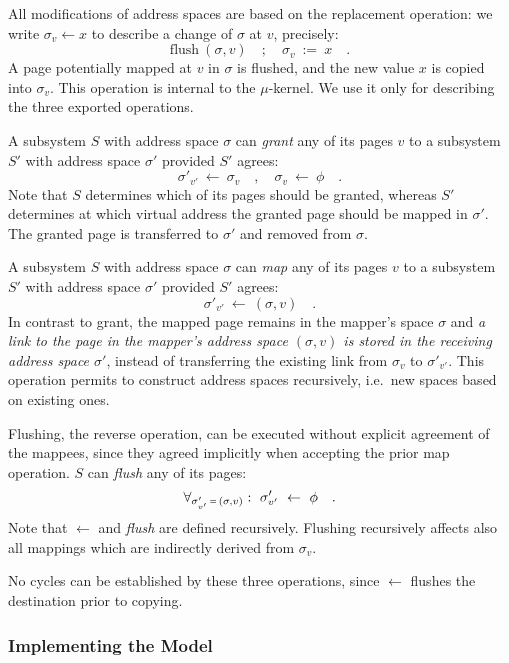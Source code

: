 \documentclass[a4paper,11pt,twoside,dvips]{book}
\newcommand{\micro}{$\mu$}
\newcommand{\smaller}[1]{{\mathchoice 
           {\raisebox{1pt}{$\scriptstyle #1$}} 
           {\raisebox{1pt}{$\scriptstyle #1$}} 
           {\raisebox{0.5pt}{$\scriptscriptstyle #1$}} 
           {\raisebox{0.5pt}{$\scriptscriptstyle #1$}} 
}}
\newcommand{\EQ}{\smaller{=}}
\newcommand{\repl}{\leftarrow}
\begin{document}
All modifications of address spaces are based on the
replacement operation: we write $\sigma_v \repl x$ to describe a change of
$\sigma$ at $v$, precisely: 
% 
\[       \mbox{flush}\ (\sigma,v) \quad ; \quad \sigma_v\ :=\ x  \quad . \] 
% 
A page potentially mapped at $v$ in $\sigma$ is flushed, and the new value
$x$ is copied into $\sigma_v$.
This operation is internal to the \micro-kernel. We use it only for
describing the three exported operations. 



A subsystem $S$ with address space $\sigma$ can {\em grant}
any of its pages $v$ to a subsystem $S'$ with address space
$\sigma'$ provided $S'$ agrees: 
% 
\[ \sigma'_{v'}\ \repl\ \sigma_v \quad,\quad \sigma_v\ \repl\ \phi \quad .\] 
% 
Note that $S$ determines which of its pages should be granted, whereas $S'$
determines at which virtual address the granted page should be mapped in
$\sigma'$. The granted page is transferred to $\sigma'$ and removed from
$\sigma$. 
 
 
A subsystem $S$ with address space $\sigma$ can {\em map}
any of its pages $v$ to a subsystem $S'$ with address space
$\sigma'$ provided $S'$ agrees: 
% 
\[ \sigma'_{v'}\ \repl\ ( \sigma, v) \quad . \] 
% 
In contrast to grant, the mapped page remains in the mapper's space $\sigma$
and {\em a link to the page in the mapper's address space $(\sigma,v)$ is
stored in the receiving address space $\sigma'$}, instead of transferring the
existing link from $\sigma_v$ to $\sigma'_{v'}$. This operation permits to
construct address spaces recursively, i.e.\ new spaces based on existing
ones.
 

Flushing, the reverse operation, can be executed without explicit agreement
of the mappees, since they agreed implicitly when accepting the prior map
operation. $S$ can {\em flush} any of its pages: 
% 
\[ \forall_{\sigma'_{v'}\,\EQ\,(\sigma,v)} :\ \sigma'_{v'}\ \repl\ \phi \quad . \] 
% 
Note that $\repl$ and {\em flush} are defined recursively. Flushing recursively
affects also all mappings which are indirectly derived from $\sigma_v$.
 
 
No cycles can be established by these three
operations, since $\repl$ flushes the destination prior to copying. 
 
 
 
\subsubsection*{Implementing the Model} 
 
\end{document}
